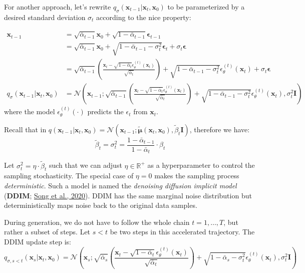 \documentclass[12pt]{article}
\begin{document}
For another approach, let's rewrite $q_\sigma(\mathbf{x}_{t-1} \vert \mathbf{x}_t, \mathbf{x}_0)$ to be parameterized by a desired standard deviation $\sigma_t$ according to the nice property:

\[
\begin{aligned}
\mathbf{x}_{t-1} 
&= \sqrt{\bar{\alpha}_{t-1}}\mathbf{x}_0 +  \sqrt{1 - \bar{\alpha}_{t-1}}\boldsymbol{\epsilon}_{t-1} \\
&= \sqrt{\bar{\alpha}_{t-1}}\mathbf{x}_0 + \sqrt{1 - \bar{\alpha}_{t-1} - \sigma_t^2} \boldsymbol{\epsilon}_t + \sigma_t\boldsymbol{\epsilon} \\
&= \sqrt{\bar{\alpha}_{t-1}} \left( \frac{\mathbf{x}_t - \sqrt{1 - \bar{\alpha}_t} \epsilon^{(t)}_\theta(\mathbf{x}_t)}{\sqrt{\bar{\alpha}_t}} \right) + \sqrt{1 - \bar{\alpha}_{t-1} - \sigma_t^2} \epsilon^{(t)}_\theta(\mathbf{x}_t) + \sigma_t\boldsymbol{\epsilon} \\
q_\sigma(\mathbf{x}_{t-1} \vert \mathbf{x}_t, \mathbf{x}_0)
&= \mathcal{N}\left(\mathbf{x}_{t-1}; \sqrt{\bar{\alpha}_{t-1}} \left( \frac{\mathbf{x}_t - \sqrt{1 - \bar{\alpha}_t} \epsilon^{(t)}_\theta(\mathbf{x}_t)}{\sqrt{\bar{\alpha}_t}} \right) + \sqrt{1 - \bar{\alpha}_{t-1} - \sigma_t^2} \epsilon^{(t)}_\theta(\mathbf{x}_t), \sigma_t^2 \mathbf{I}\right)
\end{aligned}
\]
where the model $\epsilon^{(t)}_\theta(\cdot)$ predicts the $\epsilon_t$ from $\mathbf{x}_t$.

Recall that in $q(\mathbf{x}_{t-1} \vert \mathbf{x}_t, \mathbf{x}_0) = \mathcal{N}(\mathbf{x}_{t-1}; \tilde{\boldsymbol{\mu}}(\mathbf{x}_t, \mathbf{x}_0), \tilde{\beta}_t \mathbf{I})$, therefore we have:
\[
\tilde{\beta}_t = \sigma_t^2 = \frac{1 - \bar{\alpha}_{t-1}}{1 - \bar{\alpha}_t} \cdot \beta_t
\]

Let $\sigma_t^2 = \eta \cdot \tilde{\beta}_t$ such that we can adjust $\eta \in \mathbb{R}^+$ as a hyperparameter to control the sampling stochasticity. The special case of $\eta = 0$ makes the sampling process \emph{deterministic}. Such a model is named the \emph{denoising diffusion implicit model} (\textbf{DDIM}; \href{https://arxiv.org/abs/2010.02502}{Song et al., 2020}). DDIM has the same marginal noise distribution but deterministically maps noise back to the original data samples.

During generation, we do not have to follow the whole chain $t=1,\dots,T$, but rather a subset of steps. Let $s < t$ be two steps in this accelerated trajectory. The DDIM update step is:
\[
q_{\sigma, s < t}(\mathbf{x}_s \vert \mathbf{x}_t, \mathbf{x}_0)
= \mathcal{N}\left(\mathbf{x}_s; \sqrt{\bar{\alpha}_s} \left( \frac{\mathbf{x}_t - \sqrt{1 - \bar{\alpha}_t} \epsilon^{(t)}_\theta(\mathbf{x}_t)}{\sqrt{\bar{\alpha}_t}} \right) + \sqrt{1 - \bar{\alpha}_s - \sigma_t^2} \epsilon^{(t)}_\theta(\mathbf{x}_t), \sigma_t^2 \mathbf{I}\right)
\]
\end{document}
